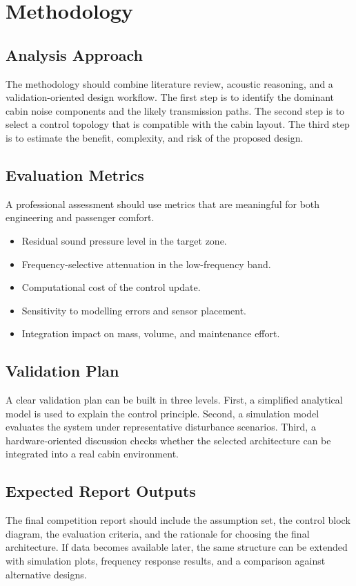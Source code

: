 \chapter{Methodology}

\section{Analysis Approach}
The methodology should combine literature review, acoustic reasoning, and a validation-oriented design workflow. The first step is to identify the dominant cabin noise components and the likely transmission paths. The second step is to select a control topology that is compatible with the cabin layout. The third step is to estimate the benefit, complexity, and risk of the proposed design.

\section{Evaluation Metrics}
A professional assessment should use metrics that are meaningful for both engineering and passenger comfort.
\begin{itemize}
    \item Residual sound pressure level in the target zone.
    \item Frequency-selective attenuation in the low-frequency band.
    \item Computational cost of the control update.
    \item Sensitivity to modelling errors and sensor placement.
    \item Integration impact on mass, volume, and maintenance effort.
\end{itemize}

\section{Validation Plan}
A clear validation plan can be built in three levels. First, a simplified analytical model is used to explain the control principle. Second, a simulation model evaluates the system under representative disturbance scenarios. Third, a hardware-oriented discussion checks whether the selected architecture can be integrated into a real cabin environment.

\section{Expected Report Outputs}
The final competition report should include the assumption set, the control block diagram, the evaluation criteria, and the rationale for choosing the final architecture. If data becomes available later, the same structure can be extended with simulation plots, frequency response results, and a comparison against alternative designs.
